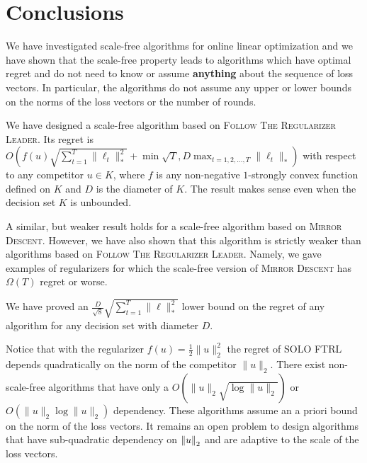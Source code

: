 \section{Conclusions}
\label{section:conclusions}

We have investigated scale-free algorithms for online linear optimization and
we have shown that the scale-free property leads to algorithms which have optimal
regret and do not need to know or assume \textbf{anything} about the sequence
of loss vectors. In particular, the algorithms do not assume any upper or lower
bounds on the norms of the loss vectors or the number of rounds.

We have designed a scale-free algorithm based on \textsc{Follow The Regularizer
Leader}. Its regret is $O \left(f(u) \sqrt{\sum_{t=1}^T \|\ell_t\|_*^2} +
\min{\sqrt{T}, D} \max_{t=1,2,\dots,T} \|\ell_t\|_* \right)$ with respect to any
competitor $u \in K$, where $f$ is any non-negative $1$-strongly convex function
defined on $K$ and $D$ is the diameter of $K$. The result makes sense even when
the decision set $K$ is unbounded.

A similar, but weaker result holds for a scale-free algorithm based on
\textsc{Mirror Descent}. However, we have also shown that this algorithm is
strictly weaker than algorithms based on \textsc{Follow The Regularizer Leader}.
Namely, we gave examples of regularizers for which the scale-free version of
\textsc{Mirror Descent} has $\Omega(T)$ regret or worse.

We have proved an $\frac{D}{\sqrt{8}} \sqrt{\sum_{t=1}^T \|\ell\|_*^2}$ lower
bound on the regret of any algorithm for any decision set with diameter $D$.

Notice that with the regularizer $f(u) = \frac{1}{2}\|u\|_2^2$ the regret of
\textsc{SOLO FTRL} depends quadratically on the norm of the competitor
$\|u\|_2$. There exist non-scale-free algorithms \cite{McMahan-Streeter-2012,
McMahan-Abernethy-2013, Orabona-2013, McMahan-Orabona-2014, Orabona-2014} that
have only a $O(\|u\|_2 \sqrt{\log \|u\|_2})$ or $O(\|u\|_2 \log \|u\|_2)$
dependency.  These algorithms assume an a priori bound on the norm of the loss
vectors. It remains an open problem to design algorithms that have sub-quadratic
dependency on ${\left\|{u}\right\|}_2$ and are adaptive to the scale of the loss vectors.
